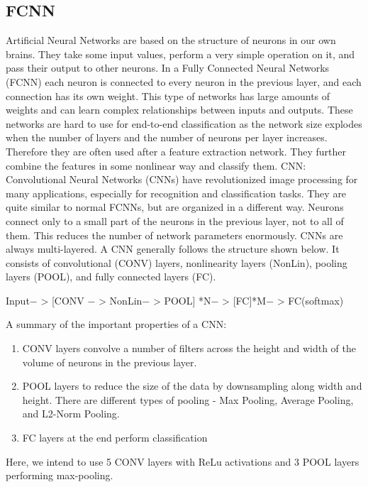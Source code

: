 \documentclass{article}
\begin{document}
\subsection{FCNN}
Artificial Neural Networks are based on the structure of neurons in our own brains. They take some input values, perform a very simple operation on it, and pass their output to other neurons. In a Fully Connected Neural Networks (FCNN) each neuron is connected to every neuron in the previous layer, and each connection has its own weight. This type of networks has large amounts of weights and can learn complex relationships between inputs and outputs. These networks are hard to use for end-to-end classification as the network size explodes when the number of layers and the number of neurons per layer increases. Therefore they are often used after a feature extraction network. They further combine the features in some nonlinear way and classify them.
CNN: Convolutional Neural Networks (CNNs) have revolutionized image processing for many applications, especially for recognition and classification tasks. They are quite similar to normal FCNNs, but are organized in a different way.  Neurons connect only to a small part of the neurons in the previous layer, not to all of them. This reduces the number of network parameters enormously. CNNs are always multi-layered.
A CNN generally follows the structure shown below. It consists of convolutional (CONV) layers, nonlinearity layers (NonLin), pooling layers (POOL), and fully connected layers (FC).

Input− > [CONV − > NonLin− > POOL] *N− > [FC]*M− > FC(softmax)

A summary of the important properties of a CNN:
\begin{enumerate}
\item CONV layers convolve a number of filters across the height and width of the volume of neurons in the previous layer.
\item POOL layers to reduce the size of the data by downsampling along width and height. There are different types of pooling - Max Pooling, Average Pooling, and L2-Norm Pooling.
\item FC layers at the end perform classification
\end{enumerate}

Here, we intend to use 5 CONV layers with ReLu activations and 3 POOL layers performing max-pooling.
\end{document}
